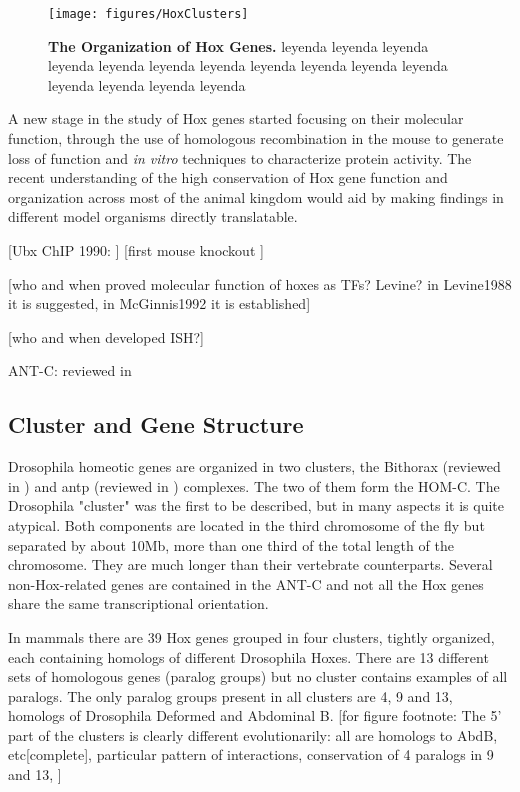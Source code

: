 \begin{figure}[]
  
  \centering
  \texttt{[image: figures/HoxClusters]}
  \caption[The Organization of Hox Genes]{\textbf{The Organization of Hox Genes.} leyenda leyenda leyenda leyenda leyenda leyenda leyenda leyenda leyenda leyenda leyenda leyenda leyenda leyenda leyenda}
  \label{fig:hoxclusters}
\end{figure}

A new stage in the study of Hox genes started focusing on their molecular function, through the use of homologous recombination in the mouse to generate loss of function and \textit{in vitro} techniques to characterize protein activity. The recent understanding of the high conservation of Hox gene function and organization across most of the animal kingdom would aid by making findings in different model organisms directly translatable. 

[Ubx ChIP 1990: \cite{Gould1990}]
[first mouse knockout \cite{Thomas1987}]

[who and when proved molecular function of hoxes as TFs? Levine? in Levine1988 it is suggested, in McGinnis1992 it is established]

[who and when developed ISH?]

\ac{ANT-C}: reviewed in \cite{Kaufman1990}

\subsection{Cluster and Gene Structure}


Drosophila homeotic genes are organized in two clusters, the  Bithorax (reviewed in \cite{Lewis1978}) and \ac{antp} (reviewed in \cite{Kaufman1990}) complexes. The two of them form the HOM-C. The Drosophila "cluster" was the first to be described, but in many aspects it is quite atypical. Both components are located in the third chromosome of the fly but separated by about 10Mb, more than one third of the total length of the chromosome. They are much longer than their vertebrate counterparts. Several non-Hox-related genes are contained in the \ac{ANT-C} and not all the Hox genes share the same transcriptional orientation. 

In mammals there are 39 Hox genes grouped in four clusters, tightly organized, each containing homologs of different Drosophila Hoxes. There are 13 different sets of homologous genes (paralog groups) but no cluster contains examples of all paralogs. The only paralog groups present in all clusters are 4, 9 and 13, homologs of Drosophila Deformed and Abdominal B. [for figure footnote: The 5' part of the clusters is clearly different evolutionarily: all are homologs to AbdB, etc[complete], particular pattern of interactions, conservation of 4 paralogs in 9 and 13, ] 

